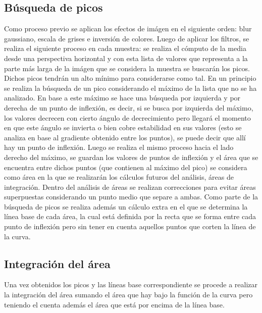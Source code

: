 \subsection{B\'usqueda de picos}
Como proceso previo se aplican los efectos de im\'agen en el siguiente orden: blur gaussiano, escala de grises e inversi\'on de colores. Luego de aplicar los filtros, se realiza el siguiente proceso en cada muestra: se realiza el c\'omputo de la media desde una perspectiva horizontal y con esta lista de valores que representa  a la parte m\'as larga de la im\'agen que se considera la muestra se buscar\'an los picos. Dichos picos tendr\'an un alto m\'inimo para considerarse como tal. En un principio se realiza la b\'usqueda de un pico considerando el m\'aximo de la lista que no se ha analizado. En base a este m\'aximo se hace una b\'usqueda por izquierda y por derecha de un punto de inflexi\'on, es decir, si se busca por izquierda del m\'aximo, los valores decrecen con cierto \'angulo de decrecimiento pero llegar\'a el momento en que este \'angulo se invierta o bien cobre estabilidad en sus valores (esto se analiza en base al gradiente obtenido entre los puntos), se puede decir que all\'i hay un punto de inflexi\'on. Luego se realiza el mismo proceso hacia el lado derecho del m\'aximo, se guardan los valores de puntos de inflexi\'on y el \'area que se encuentra entre dichos puntos (que contienen al m\'aximo del pico) se considera como \'area en la que se realizar\'an los c\'alculos futuros del an\'alisis, \'areas de integraci\'on. Dentro del an\'alisis de \'areas se realizan correcciones para evitar \'areas superpuestas considerando un punto medio que separe a ambas.
Como parte de la b\'usqueda de picos se realiza adem\'as un c\'alculo extra en el que se determina la l\'inea base de cada \'area, la cual est\'a definida por la recta que se forma entre cada punto de inflexi\'on pero sin tener en cuenta aquellos puntos que corten la l\'inea de la curva.

\subsection{Integraci\'on del \'area}
Una vez obtenidos los picos y las l\'ineas base correspondiente se procede a realizar la integraci\'on del \'area sumando el \'area que hay bajo la funci\'on de la curva pero teniendo el cuenta adem\'as el \'area que est\'a por encima de la l\'inea base.

